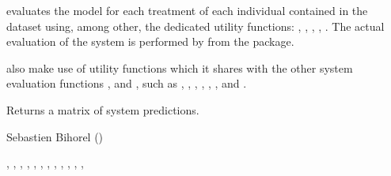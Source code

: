 %
\begin{Details}\relax
{} evaluates the model for each treatment of each individual 
contained in the dataset using, among other, the dedicated utility functions:
, , , , 
. The actual evaluation of the system is performed 
by  from the  package.

 also make use of utility functions which it shares with the 
other system evaluation functions , and ,
such as , , , 
, , , and 
.
\end{Details}
%
\begin{Value}
Returns a matrix of system predictions.
\end{Value}
%
\begin{Author}\relax
Sebastien Bihorel ()
\end{Author}
%
\begin{SeeAlso}\relax
{},
, , 
, ,
, 
, ,
, ,
, ,
\end{SeeAlso}
